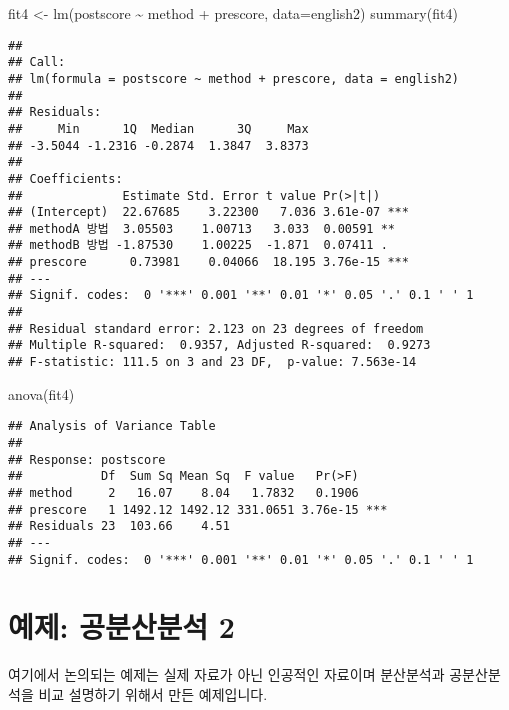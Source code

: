 \documentclass[
]{book}
\makeatletter
\newenvironment{Shaded}{\begin{snugshade}}{\end{snugshade}}
\newcommand{\AttributeTok}[1]{\textcolor[rgb]{0.77,0.63,0.00}{#1}}
\newcommand{\FunctionTok}[1]{\textcolor[rgb]{0.00,0.00,0.00}{#1}}
\newcommand{\NormalTok}[1]{#1}
\newcommand{\OtherTok}[1]{\textcolor[rgb]{0.56,0.35,0.01}{#1}}
\newcommand{\SpecialCharTok}[1]{\textcolor[rgb]{0.00,0.00,0.00}{#1}}
\newenvironment{kframe}{%
\medskip{}
\setlength{\fboxsep}{.8em}
 \def\at@end@of@kframe{}%
 \ifinner\ifhmode%
  \def\at@end@of@kframe{\end{minipage}}%
  \begin{minipage}{\columnwidth}%
 \fi\fi%
 \def\FrameCommand##1{\hskip\@totalleftmargin \hskip-\fboxsep
 \colorbox{shadecolor}{##1}\hskip-\fboxsep
     \hskip-\linewidth \hskip-\@totalleftmargin \hskip\columnwidth}%
 \MakeFramed {\advance\hsize-\width
   \@totalleftmargin\z@ \linewidth\hsize
   \@setminipage}}%
 {\par\unskip\endMakeFramed%
 \at@end@of@kframe}
\newenvironment{rmdblock}[1]
  {
  \begin{itemize}
  \renewcommand{\labelitemi}{
    \raisebox{-.7\height}[0pt][0pt]{
      {\setkeys{Gin}{width=3em,keepaspectratio}\texttt{[image: images/\#1]}}
    }
  }
  \setlength{\fboxsep}{1em}
  \begin{kframe}
  \item
  }
  {
  \end{kframe}
  \end{itemize}
  }
\newenvironment{rmdwarning}
  {\begin{rmdblock}{warning}}
  {\end{rmdblock}}
\makeatother
\begin{document}
\begin{Shaded}
\begin{Highlighting}[]
\NormalTok{fit4 }\OtherTok{\textless{}{-}} \FunctionTok{lm}\NormalTok{(postscore }\SpecialCharTok{\textasciitilde{}}\NormalTok{ method }\SpecialCharTok{+}\NormalTok{ prescore, }\AttributeTok{data=}\NormalTok{english2)}
\FunctionTok{summary}\NormalTok{(fit4)}
\end{Highlighting}
\end{Shaded}

\begin{verbatim}
## 
## Call:
## lm(formula = postscore ~ method + prescore, data = english2)
## 
## Residuals:
##     Min      1Q  Median      3Q     Max 
## -3.5044 -1.2316 -0.2874  1.3847  3.8373 
## 
## Coefficients:
##              Estimate Std. Error t value Pr(>|t|)    
## (Intercept)  22.67685    3.22300   7.036 3.61e-07 ***
## methodA 방법  3.05503    1.00713   3.033  0.00591 ** 
## methodB 방법 -1.87530    1.00225  -1.871  0.07411 .  
## prescore      0.73981    0.04066  18.195 3.76e-15 ***
## ---
## Signif. codes:  0 '***' 0.001 '**' 0.01 '*' 0.05 '.' 0.1 ' ' 1
## 
## Residual standard error: 2.123 on 23 degrees of freedom
## Multiple R-squared:  0.9357, Adjusted R-squared:  0.9273 
## F-statistic: 111.5 on 3 and 23 DF,  p-value: 7.563e-14
\end{verbatim}

\begin{Shaded}
\begin{Highlighting}[]
\FunctionTok{anova}\NormalTok{(fit4)}
\end{Highlighting}
\end{Shaded}

\begin{verbatim}
## Analysis of Variance Table
## 
## Response: postscore
##           Df  Sum Sq Mean Sq  F value   Pr(>F)    
## method     2   16.07    8.04   1.7832   0.1906    
## prescore   1 1492.12 1492.12 331.0651 3.76e-15 ***
## Residuals 23  103.66    4.51                      
## ---
## Signif. codes:  0 '***' 0.001 '**' 0.01 '*' 0.05 '.' 0.1 ' ' 1
\end{verbatim}

\hypertarget{uxc608uxc81c-uxacf5uxbd84uxc0b0uxbd84uxc11d-2}{%
\section{예제: 공분산분석 2}\label{uxc608uxc81c-uxacf5uxbd84uxc0b0uxbd84uxc11d-2}}

\begin{rmdwarning}
여기에서 논의되는 예제는 실제 자료가 아닌 인공적인 자료이며 분산분석과 공분산분석을 비교 설명하기 위해서 만든 예제입니다.
\end{rmdwarning}
\end{document}
